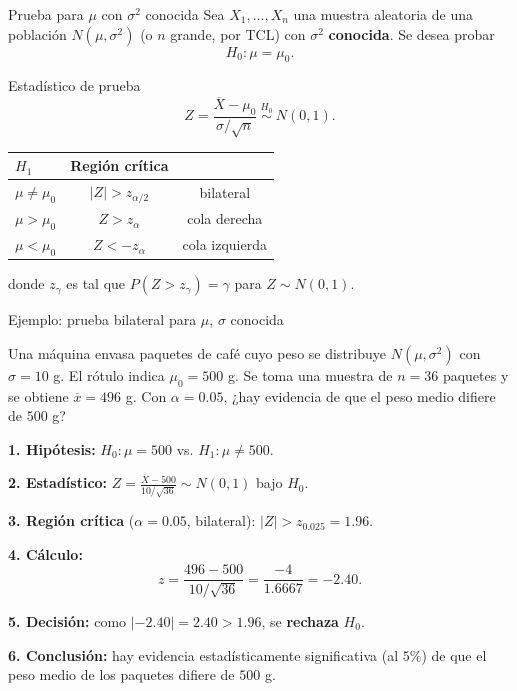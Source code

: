 \documentclass[aspectratio=169,11pt]{beamer}
\begin{document}
\begin{frame}{Prueba para $\mu$ con $\sigma^2$ conocida}
Sea $X_1,\dots,X_n$ una muestra aleatoria de una población $N(\mu,\sigma^2)$ (o $n$ grande, por TCL) con $\sigma^2$ \textbf{conocida}. Se desea probar
\[
H_0: \mu=\mu_0.
\]

\begin{block}{Estadístico de prueba}
\[
Z = \frac{\overline{X}-\mu_0}{\sigma/\sqrt{n}} \ \overset{H_0}{\sim}\ N(0,1).
\]
\end{block}

\begin{table}[]
\centering
\small
\begin{tabular}{@{}lcc@{}}
\toprule
$H_1$ & Región crítica & \\
\midrule
$\mu\neq\mu_0$ & $|Z|>z_{\alpha/2}$ & bilateral \\
$\mu>\mu_0$ & $Z>z_{\alpha}$ & cola derecha \\
$\mu<\mu_0$ & $Z<-z_{\alpha}$ & cola izquierda \\
\bottomrule
\end{tabular}
\end{table}
donde $z_\gamma$ es tal que $P(Z>z_\gamma)=\gamma$ para $Z\sim N(0,1)$.
\end{frame}

\begin{frame}{Ejemplo: prueba bilateral para $\mu$, $\sigma$ conocida}
\begin{example}
Una máquina envasa paquetes de café cuyo peso se distribuye $N(\mu,\sigma^2)$ con $\sigma=10$ g. El rótulo indica $\mu_0=500$ g. Se toma una muestra de $n=36$ paquetes y se obtiene $\overline{x}=496$ g. Con $\alpha=0.05$, ¿hay evidencia de que el peso medio difiere de $500$ g?

\textbf{1. Hipótesis:} $H_0:\mu=500$ vs. $H_1:\mu\neq500$.

\textbf{2. Estadístico:} $\displaystyle Z=\frac{\overline{X}-500}{10/\sqrt{36}}\sim N(0,1)$ bajo $H_0$.

\textbf{3. Región crítica} ($\alpha=0.05$, bilateral): $|Z|>z_{0.025}=1.96$.

\textbf{4. Cálculo:}
\[
z=\frac{496-500}{10/\sqrt{36}}=\frac{-4}{1.6667}=-2.40.
\]

\textbf{5. Decisión:} como $|-2.40|=2.40>1.96$, se \textbf{rechaza} $H_0$.

\textbf{6. Conclusión:} hay evidencia estadísticamente significativa (al $5\%$) de que el peso medio de los paquetes difiere de $500$ g.
\end{example}
\end{frame}
\end{document}
